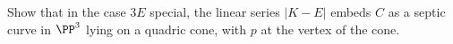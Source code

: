 \begin{exercise}
Show that in the case $3E$ special, the linear series $|K-E|$ embeds $C$ as a septic curve in $\PP^3$ lying on a quadric cone, with $p$ at the vertex of the cone.
\end{exercise}



%
%


